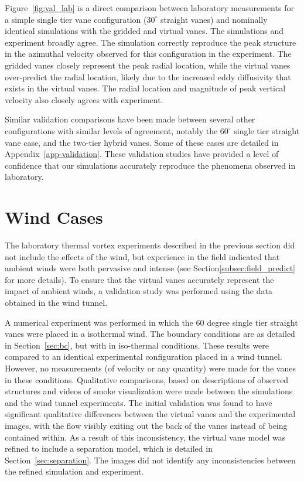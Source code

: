 Figure~\ref{fig:val_lab} is a direct comparison
between laboratory  
measurements for a simple single tier vane configuration ($30^{\circ}$
straight vanes) and nominally identical simulations with the gridded and
virtual vanes. The simulations and experiment broadly agree. The
simulation correctly reproduce the peak structure in the azimuthal
velocity observed for this configuration in the experiment. The gridded
vanes closely represent the peak radial location, while the
virtual vanes over-predict the radial location, likely due to the
increased eddy diffusivity that exists in the virtual vanes. The radial
location and magnitude of peak vertical velocity also closely agrees
with experiment. 

Similar validation comparisons have been made between several other
configurations with similar levels of agreement,  notably the
$60^{\circ}$ single tier straight vane case, and the two-tier hybrid
vanes. Some of these cases are detailed in Appendix~\ref{app-validation}.
These validation studies have provided a level of confidence that our
simulations accurately reproduce the phenomena observed in laboratory.


\section{Wind Cases}

The laboratory thermal vortex experiments described in the previous
section did not include the effects of the wind, but experience in
the field indicated that ambient winds were both pervasive and intense
(see Section\ref{subsec:field_predict} for more details). To ensure that
the virtual vanes accurately represent the impact of ambient winds, a
validation study was performed using the data obtained in the wind
tunnel. 

A numerical experiment was performed in which the 60 degree single tier
straight vanes were placed in a isothermal wind. The boundary conditions
are as detailed in Section~\ref{sec:bc}, but with in iso-thermal
conditions. These results were compared to an identical experimental
configuration placed in a wind tunnel. However, no measurements (of
velocity or any quantity) were made for the vanes in these
conditions. Qualitative comparisons, based on descriptions of observed
structures and videos of smoke visualization were made between the
simulations and the wind tunnel experiments. The initial validation was
found to have significant qualitative differences between the virtual
vanes and the experimental images, with the flow visibly exiting out the
back of the vanes instead of being contained within.  As a result of
this inconsistency, the virtual vane model was refined to include a
separation model, which is detailed in Section~\ref{sec:separation}. The
images  did not identify any inconsistencies between the refined
simulation and experiment.   

